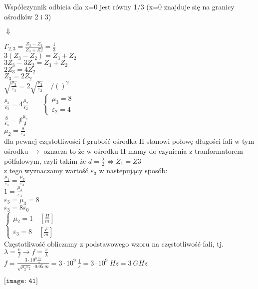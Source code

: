 \begin{solution}
Współczynnik odbicia dla x=0 jest równy 1/3 (x=0 znajduje się na granicy ośrodków 2 i 3) 
\begin{center}
$\Downarrow $\\
\end{center}
$\Gamma_{2,3} = \frac{Z_{3}-Z_{2}}{Z_{3}+Z{2}} = \frac{1}{3} $\\
$3(Z_{3}-Z_{2}) = Z_{3}+Z_{2}$\\
$3Z_{3}-3Z_{2} = Z_{3}+Z_{2}$\\
$2Z_{3} = 4Z_{2}$\\
$Z_{3} = 2Z_{2}$\\
$\sqrt{\frac{\mu_{3}}{\varepsilon_{3}}} = 2\sqrt{\frac{\mu_{2}}{\varepsilon_{2}}} \quad / ()^{2}$ \\
$\frac{ \mu_{3} }{ \varepsilon_{3} } = 4\frac{\mu_{2}}{\varepsilon_{2}} \qquad \begin{cases} \mu_{3}=8\\\varepsilon_{2}=4\end{cases}$ \\
$ \frac {8}{\varepsilon_{3}} = \not 4 \frac{\mu_{2}}{\not 4} $ \\
$ \mu_{2} = \frac{8}{\varepsilon_{3}}$ \\

dla pewnej częstotliwości f grubość ośrodka II stanowi połowę długości fali w tym ośrodku $\rightarrow$ oznacza to że w ośrodku II mamy do czynienia z tranformatorem półfalowym, czyli takim że $d = \frac{\lambda}{2} \Longleftrightarrow  Z_{1}=Z{3}$\\
z tego wyznaczamy wartość $\varepsilon_{3}$ w nastepujący sposób:\\
$\frac{ \mu_{1} }{ \varepsilon_{1} } = \frac{\mu_{3}}{\varepsilon_{3}}$\\
$1 = \frac{\mu_{3}}{\varepsilon_{3}}$\\
$\varepsilon_{3} = \mu_{3} = 8$\\
$\varepsilon_{3} = 8 \varepsilon_{0} $\\
$\begin{cases} \mu_{2}=1 \quad [\frac{H}{m}]\\\varepsilon_{3}=8 \quad [\frac{F}{m}]\end{cases}$\\
Częstotliwość obliczamy z podstawowego wzoru na częstotliwość fali, tj.
$\lambda = \frac{v}{f} \rightarrow f = \frac{v}{\lambda}$\\
$f = \frac{3 \cdot 10^{8} \frac{m}{s}}{ \sqrt{\mu_{2} \varepsilon_{2}} \cdot 0.05 \ m} = 3 \cdot 10^{9} \ \frac{1}{s} = 3 \cdot 10^{9} \ Hz = 3 \ GHz$\\
\begin{center}
    $\texttt{[image: 41]}$\\
\end{center}
\end{solution}